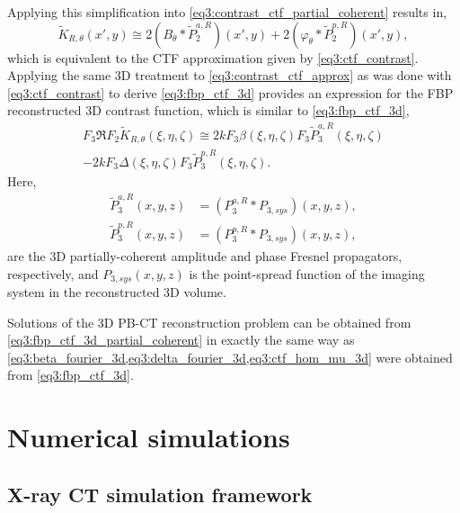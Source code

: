 \documentclass[twocolumn, switch]{article} %
\begin{document}
Applying this simplification into \cref{eq3:contrast_ctf_partial_coherent} results in,
\begin{equation}
    \label{eq3:contrast_ctf_approx}
    {\tilde K_{R,\theta }}\left( {x',y} \right) \cong 2\left( {{B_\theta } * \tilde P_2^{a,R}} \right)\left( {x',y} \right) + 2\left( {{\varphi _\theta } * \tilde P_2^{p,R}} \right)\left( {x',y} \right),
\end{equation}
which is equivalent to the CTF approximation given by \cref{eq3:ctf_contrast}.
Applying the same 3D treatment to \cref{eq3:contrast_ctf_approx} as was done with \cref{eq3:ctf_contrast} to derive \cref{eq3:fbp_ctf_3d} provides an expression for the FBP reconstructed 3D contrast function, which is similar to \cref{eq3:fbp_ctf_3d},
\begin{multline}   
    \label{eq3:fbp_ctf_3d_partial_coherent}
    {F_3}\Re {F_2}{\tilde K_{R,\theta }}\left( {\xi ,\eta ,\zeta } \right) \cong 2k{F_3}\beta \left( {\xi ,\eta ,\zeta } \right){F_3}\tilde P_3^{a,R}\left( {\xi ,\eta ,\zeta } \right) \\
    - 2k{F_3}\Delta \left( {\xi ,\eta ,\zeta } \right){F_3}\tilde P_3^{p,R}\left( {\xi ,\eta ,\zeta } \right).
\end{multline}
Here, 
\begin{align*}
\tilde P_3^{a,R}\left( {x,y,z} \right) & = \left( {P_3^{a,R} * {P_{3,sys}}} \right)\left( {x,y,z} \right), \\
\tilde P_3^{p,R}\left( {x,y,z} \right) & = \left( {P_3^{p,R} * {P_{3,sys}}} \right)\left( {x,y,z} \right),    
\end{align*}
are the 3D partially-coherent amplitude and phase Fresnel propagators, respectively, and ${P_{3,sys}}\left( {x,y,z} \right)$ is the point-spread function of the imaging system in the reconstructed 3D volume.

Solutions of the 3D PB-CT reconstruction problem can be obtained from \cref{eq3:fbp_ctf_3d_partial_coherent} in exactly the same way as \cref{eq3:beta_fourier_3d,eq3:delta_fourier_3d,eq3:ctf_hom_mu_3d} were obtained from \cref{eq3:fbp_ctf_3d}.

\section{Numerical simulations} \label{s3:numerical_simulation_framework}

\subsection{X-ray CT simulation framework}
\end{document}
